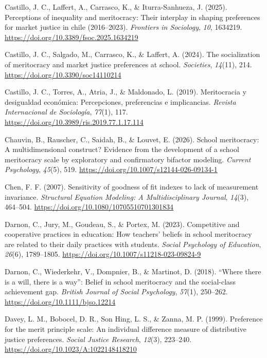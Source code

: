 \documentclass[
  13pt,
]{article}
\newlength{\cslhangindent}
\newenvironment{CSLReferences}[2] %
 {\begin{list}{}{%
  \setlength{\itemindent}{0pt}
  \setlength{\leftmargin}{0pt}
  \setlength{\parsep}{0pt}
  \ifodd #1
   \setlength{\leftmargin}{\cslhangindent}
   \setlength{\itemindent}{-1\cslhangindent}
  \fi
  \setlength{\itemsep}{#2\baselineskip}}}
 {\end{list}}
\begin{document}
\begin{CSLReferences}{1}{0}
Castillo, J. C., Laffert, A., Carrasco, K., \& Iturra-Sanhueza, J.
(2025). Perceptions of inequality and meritocracy: Their interplay in
shaping preferences for market justice in chile (2016--2023).
\emph{Frontiers in Sociology}, \emph{10}, 1634219.
\url{https://doi.org/10.3389/fsoc.2025.1634219}

Castillo, J. C., Salgado, M., Carrasco, K., \& Laffert, A. (2024). The
socialization of meritocracy and market justice preferences at school.
\emph{Societies}, \emph{14}(11), 214.
\url{https://doi.org/10.3390/soc14110214}

Castillo, J. C., Torres, A., Atria, J., \& Maldonado, L. (2019).
Meritocracia y desigualdad económica: Percepciones, preferencias e
implicancias. \emph{Revista Internacional de Sociología}, \emph{77}(1),
117. \url{https://doi.org/10.3989/ris.2019.77.1.17.114}

Chauvin, B., Rauscher, C., Saidah, B., \& Louvet, E. (2026). School
meritocracy: A multidimensional construct? Evidence from the development
of a school meritocracy scale by exploratory and confirmatory bifactor
modeling. \emph{Current Psychology}, \emph{45}(5), 519.
\url{https://doi.org/10.1007/s12144-026-09134-1}

Chen, F. F. (2007). Sensitivity of goodness of fit indexes to lack of
measurement invariance. \emph{Structural Equation Modeling: A
Multidisciplinary Journal}, \emph{14}(3), 464--504.
\url{https://doi.org/10.1080/10705510701301834}

Darnon, C., Jury, M., Goudeau, S., \& Portex, M. (2023). Competitive and
cooperative practices in education: How teachers' beliefs in school
meritocracy are related to their daily practices with students.
\emph{Social Psychology of Education}, \emph{26}(6), 1789--1805.
\url{https://doi.org/10.1007/s11218-023-09824-9}

Darnon, C., Wiederkehr, V., Dompnier, B., \& Martinot, D. (2018).
{``Where there is a will, there is a way''}: Belief in school
meritocracy and the social-class achievement gap. \emph{British Journal
of Social Psychology}, \emph{57}(1), 250--262.
\url{https://doi.org/10.1111/bjso.12214}

Davey, L. M., Bobocel, D. R., Son Hing, L. S., \& Zanna, M. P. (1999).
Preference for the merit principle scale: An individual difference
measure of distributive justice preferences. \emph{Social Justice
Research}, \emph{12}(3), 223--240.
\url{https://doi.org/10.1023/A:1022148418210}


\end{CSLReferences}
\end{document}
